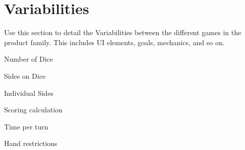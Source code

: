 \section{Variabilities}

Use this section to detail the Variabilities between the different games in the product family. This includes UI elements, goals, mechanics, and so on.

Number of Dice

Sides on Dice

Individual Sides

Scoring calculation

Time per turn

Hand restrictions